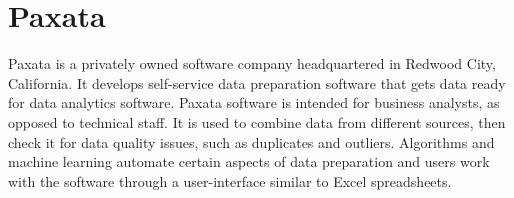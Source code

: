 \section{Paxata}

Paxata \cite{www.wikipedia} is a privately owned software company headquartered
in Redwood City, California. It develops self-service data preparation software
that gets data ready for data analytics software. Paxata software is intended
for business analysts, as opposed to technical staff. It is used to combine data
from different sources, then check it for data quality issues, such as
duplicates and outliers. Algorithms and machine
learning automate certain aspects of data preparation and users work with the
software through a user-interface similar to Excel spreadsheets.
